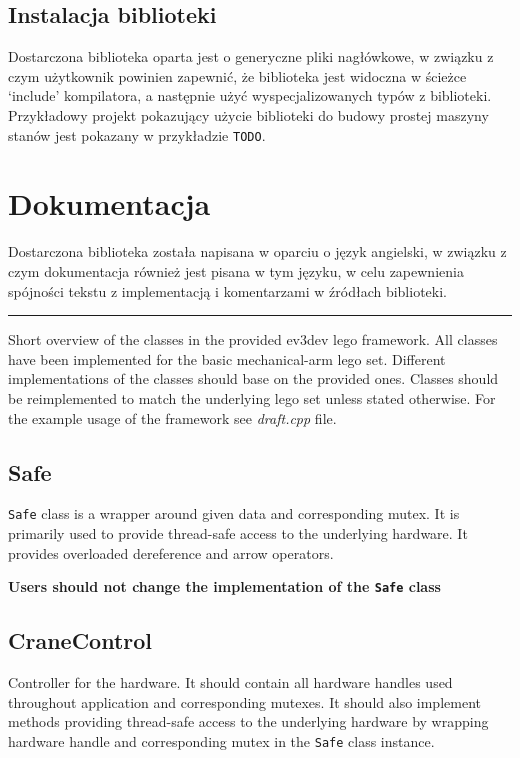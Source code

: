 \documentclass{article}
\begin{document}
\subsection{Instalacja biblioteki}
Dostarczona biblioteka oparta jest o generyczne pliki nagłówkowe, w związku z
czym użytkownik powinien zapewnić, że biblioteka jest widoczna w ścieżce
`include' kompilatora, a następnie użyć wyspecjalizowanych typów z biblioteki.
Przykładowy projekt pokazujący użycie biblioteki do budowy prostej maszyny
stanów jest pokazany w przykładzie \texttt{TODO}.
\section{Dokumentacja}
Dostarczona biblioteka została napisana w oparciu o język angielski, w związku z
czym dokumentacja również jest pisana w tym języku, w celu zapewnienia spójności
tekstu z implementacją i komentarzami w źródłach biblioteki.
\begin{center}\rule{0.5\linewidth}{\linethickness}\end{center}

Short overview of the classes in the provided ev3dev lego framework. All
classes have been implemented for the basic mechanical-arm lego set.
Different implementations of the classes should base on the provided
ones. Classes should be reimplemented to match the underlying lego set
unless stated otherwise. For the example usage of the framework see
\textit{draft.cpp} file.

\subsection*{Safe}\label{safe}

\texttt{Safe} class is a wrapper around given data and corresponding
mutex. It is primarily used to provide thread-safe access to the
underlying hardware. It provides overloaded dereference and arrow
operators.

\textbf{Users should not change the implementation of the \texttt{Safe}
class}

\subsection*{CraneControl}\label{cranecontrol}

Controller for the hardware. It should contain all hardware handles used
throughout application and corresponding mutexes. It should also
implement methods providing thread-safe access to the underlying
hardware by wrapping hardware handle and corresponding mutex in the
\texttt{Safe} class instance.
\end{document}
